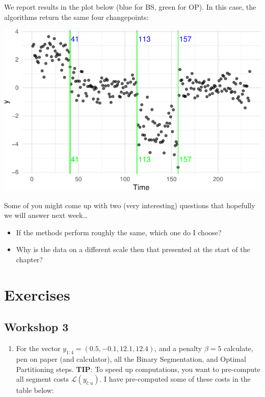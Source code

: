 \documentclass[
  letterpaper,
  DIV=11,
  numbers=noendperiod]{scrreprt}
\providecommand{\tightlist}{%
  \setlength{\itemsep}{0pt}\setlength{\parskip}{0pt}}\usepackage{longtable,booktabs,array}
\begin{document}
We report results in the plot below (blue for BS, green for OP). In this
case, the algorithms return the same four changepoints:

\includegraphics{3_multiple_changes_files/figure-pdf/unnamed-chunk-17-1.pdf}

Some of you might come up with two (very interesting) questions that
hopefully we will answer next week\ldots{}

\begin{itemize}
\item
  If the methods perform roughly the same, which one do I choose?
\item
  Why is the data on a different scale then that presented at the start
  of the chapter?
\end{itemize}

\section{Exercises}\label{exercises-2}

\subsection{Workshop 3}\label{workshop-3}

\begin{enumerate}
\def\labelenumi{\arabic{enumi}.}
\tightlist
\item
  For the vector \(y_{1:4} = (0.5, -0.1, 12.1, 12.4)\), and a penalty
  \(\beta = 5\) calculate, pen on paper (and calculator), all the Binary
  Segmentation, and Optimal Partitioning steps. \textbf{TIP}: To speed
  up computations, you want to pre-compute all segment costs
  \(\mathcal{L}(y_{l:u})\). I have pre-computed some of these costs in
  the table below:
\end{enumerate}
\end{document}
